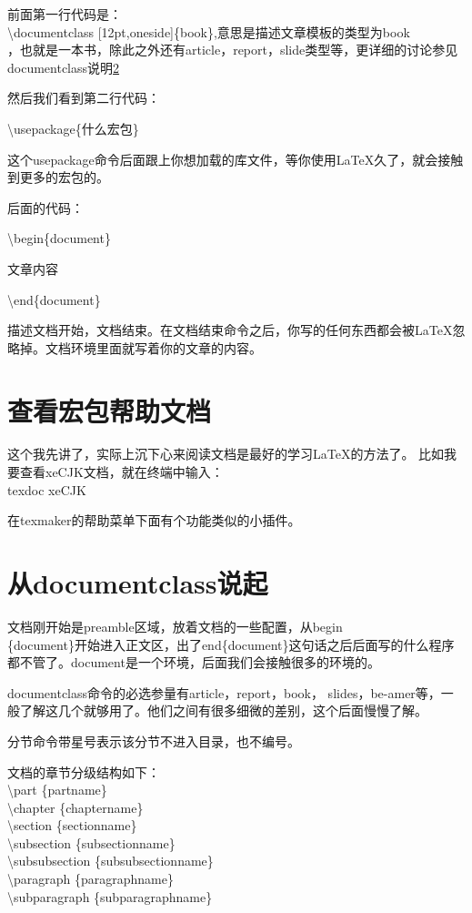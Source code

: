 \documentclass[12pt,oneside]{book}
\begin{document}
\begin{common-format}
前面第一行代码是：\\
\textbackslash documentclass [12pt,oneside]\{book\},意思是描述文章模板的类型为book\\，也就是一本书，除此之外还有article，report，slide类型等，更详细的讨论参见documentclass说明\ref{sec:documentclass}

然后我们看到第二行代码：

\textbackslash usepackage\{什么宏包\}

这个usepackage命令后面跟上你想加载的库文件，等你使用\LaTeX 久了，就会接触到更多的宏包的。

后面的代码：

\textbackslash begin\{document\}

文章内容

\textbackslash end\{document\}

描述文档开始，文档结束。在文档结束命令之后，你写的任何东西都会被\LaTeX 忽略掉。文档环境里面就写着你的文章的内容。

\section{查看宏包帮助文档}
这个我先讲了，实际上沉下心来阅读文档是最好的学习\LaTeX 的方法了。
比如我要查看xeCJK文档，就在终端中输入：\\
texdoc xeCJK

在texmaker的帮助菜单下面有个功能类似的小插件。

\section{从documentclass说起}
\label{sec:documentclass}
文档刚开始是preamble区域，放着文档的一些配置，从begin\\\{document\}开始进入正文区，出了end\{document\}这句话之后后面写的什么程序都不管了。document是一个环境，后面我们会接触很多的环境的。

documentclass命令的必选参量有article，report，book， slides，be-amer等，一般了解这几个就够用了。他们之间有很多细微的差别，这个后面慢慢了解。

分节命令带星号表示该分节不进入目录，也不编号。

文档的章节分级结构如下：\\
\textbackslash part \{partname\}\\
\textbackslash chapter \{chaptername\}\\
\textbackslash section \{sectionname\}\\
\textbackslash subsection \{subsectionname\}\\
\textbackslash subsubsection \{subsubsectionname\}\\
\textbackslash paragraph \{paragraphname\}\\
\textbackslash subparagraph \{subparagraphname\}


\end{common-format}
\end{document}
